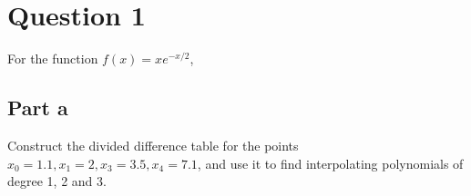 \section{Question 1}

\begin{question}
    For the function $f(x) = xe^{-x/2}$,
\end{question}

\subsection{Part a}

\begin{question}
    Construct the divided difference table for the points $x_0 = 1.1, x_1 = 2, x_3 = 3.5, x_4 = 7.1$, and use it to find interpolating polynomials of degree 1, 2 and 3.
\end{question}

